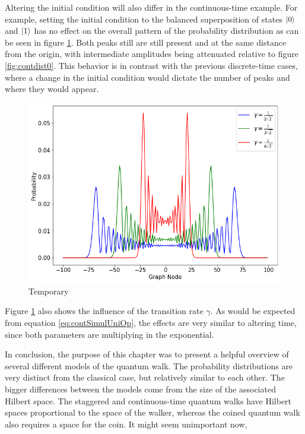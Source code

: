 \documentclass[../../dissertation.tex]{subfiles}
\begin{document}
Altering the initial condition will also differ in the
continuous-time example. For example, setting the initial condition to the
balanced superposition of states $\ket{0}$ and $\ket{1}$ has no effect on the
overall pattern of the probability distribution as can be seen in figure
\ref{fig:contdist2}. Both peaks still are still present and at the same
distance from the origin, with intermediate amplitudes being attenuated
relative to figure \ref{fig:contdist0}. This behavior is in contrast with the previous
discrete-time cases, where a change in the initial condition would dictate the
number of peaks and where they would appear.
\begin{figure}[!h]
	\centering
	\includegraphics[scale=0.40]{img/ContQuantumWalk/ctqwMultipleGammaSup.png}
	\caption{Temporary} 
	\label{fig:contdist2}
\end{figure}
Figure \ref{fig:contdist2} also shows the influence of the transition rate
$\gamma$. As would be expected from equation \ref{eq:contSimulUniOp}, the
effects are very similar to altering time, since both parameters are
multiplying in the exponential.\par
In conclusion, the purpose of this chapter was to present a helpful overview of
several different models of the quantum walk. The probability distributions are
very distinct from the classical case, but relatively similar to each other.
The bigger differences between the models come from the size of the associated
Hilbert space. The staggered and continuous-time quantum walks have
Hilbert spaces proportional to the space of the walker, whereas the coined
quantum walk also requires a space for the coin. It might seem unimportant now,
\end{document}
